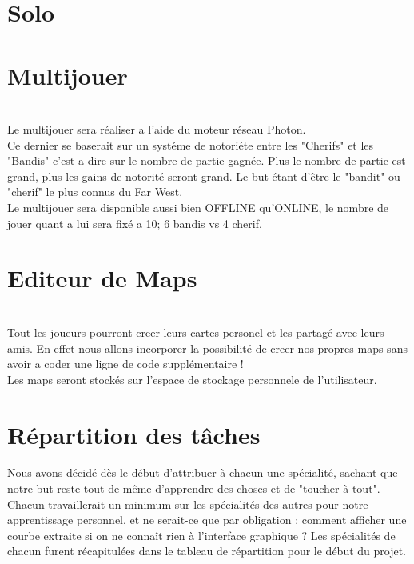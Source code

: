 \documentclass[12pt]{report}
\begin{document}
    \section{Solo}
    \section{Multijouer}
\\ Le multijouer sera réaliser a l'aide du moteur réseau Photon. \\
Ce dernier se baserait sur un systéme de notoriéte entre les "Cherifs" 
et les "Bandis" c'est a dire sur le nombre de partie gagnée. Plus le nombre de partie est grand, plus les gains de notorité seront grand. Le but étant d'être le "bandit" ou "cherif" le plus connus du Far West. 
\\ Le multijouer sera disponible aussi bien OFFLINE qu'ONLINE, le nombre de jouer quant a lui sera fixé a 10; 6 bandis vs 4 cherif.
    \section{Editeur de Maps}
\\ 
Tout les joueurs pourront creer leurs cartes personel et les partagé avec leurs amis. En effet nous allons incorporer la possibilité de creer nos propres maps sans avoir a coder une ligne de code supplémentaire !\\ Les maps seront stockés sur l'espace de stockage personnele de l'utilisateur.
    \section{Répartition des tâches} 

Nous avons décidé dès le début d'attribuer à chacun une
spécialité, sachant que notre but reste tout de même d'apprendre
des choses et de "toucher à tout". Chacun travaillerait un minimum
sur les spécialités des autres pour notre apprentissage personnel,
et ne serait-ce que par obligation : comment afficher une courbe
extraite si on ne connaît rien à l'interface graphique ?
Les spécialités de chacun furent récapitulées dans le tableau de répartition pour le début du projet.\\
\end{document}
